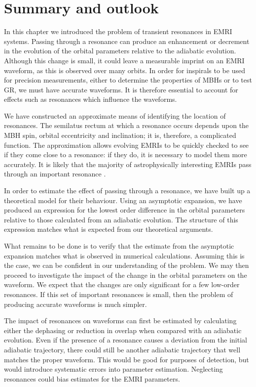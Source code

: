 \section{Summary and outlook}

In this chapter we introduced the problem of transient resonances in EMRI systems. Passing through a resonance can produce an enhancement or decrement in the evolution of the orbital parameters relative to the adiabatic evolution. Although this change is small, it could leave a measurable imprint on an EMRI waveform, as this is observed over many orbits. In order for inspirals to be used for precision measurements, either to determine the properties of MBHs or to test GR, we must have accurate waveforms. It is therefore essential to account for effects such as resonances which influence the waveforms.

We have constructed an approximate means of identifying the location of resonances. The semilatus rectum at which a resonance occurs depends upon the MBH spin, orbital eccentricity and inclination; it is, therefore, a complicated function. The approximation allows evolving EMRIs to be quickly checked to see if they come close to a resonance: if they do, it is necessary to model them more accurately. It is likely that the majority of astrophysically interesting EMRIs pass through an important resonance \citep{Ruangsri2013}.

In order to estimate the effect of passing through a resonance, we have built up a theoretical model for their behaviour. Using an asymptotic expansion, we have produced an expression for the lowest order difference in the orbital parameters relative to those calculated from an adiabatic evolution. The structure of this expression matches what is expected from our theoretical arguments.

What remains to be done is to verify that the estimate from the asymptotic expansion matches what is observed in numerical calculations. Assuming this is the case, we can be confident in our understanding of the problem. We may then proceed to investigate the impact of the change in the orbital parameters on the waveform. We expect that the changes are only significant for a few low-order resonances. If this set of important resonances is small, then the problem of producing accurate waveforms is much simpler.

The impact of resonances on waveforms can first be estimated by calculating either the dephasing or reduction in overlap when compared with an adiabatic evolution. Even if the presence of a resonance causes a deviation from the initial adiabatic trajectory, there could still be another adiabatic trajectory that well matches the proper waveform. This would be good for purposes of detection, but would introduce systematic errors into parameter estimation. Neglecting resonances could bias estimates for the EMRI parameters.

